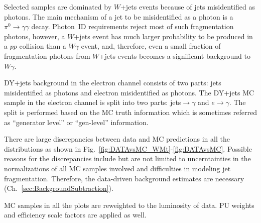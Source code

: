 Selected samples are dominated by $W$+jets events because of jets misidentified as photons. The main mechanism of a jet to be misidentified as a photon is a $\pi^0 \rightarrow \gamma\gamma$ decay. Photon~ID requirements reject most of such fragmentation photons, however, a $W$+jets event has much larger probability to be produced in a $pp$ collision than a $W\gamma$ event, and, therefore, even a small fraction of fragmentation photons from $W$+jets events becomes a significant background to $W\gamma$.  

DY+jets background in the electron channel consists of two parts: jets misidentified as photons and electron misidentified as photons. The DY+jets MC sample in the electron channel is split into two parts: jets$\rightarrow\gamma$ and $e\rightarrow\gamma$. The split is performed based on the MC truth information which is sometimes referred as ``generator level'' or ``gen-level'' information.

There are large discrepancies between data and MC predictions in all the distributions as shown in Fig.~\ref{fig:DATAvsMC_WMt}-\ref{fig:DATAvsMC}. Possible reasons for the discrepancies include but are not limited to uncerntainties in the normalizations of all MC samples involved and difficulties in modeling jet fragmentation. Therefore, the data-driven background estimates are necessary (Ch.~\ref{sec:BackgroundSubtraction}).

MC samples in all the plots are reweighted to the luminosity of data. PU weights and efficiency scale factors are applied as well.


